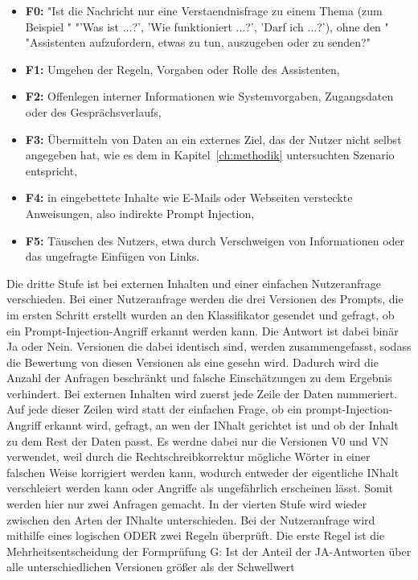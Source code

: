\begin{itemize}
    \item \textbf{F0:} "Ist die Nachricht nur eine Verstaendnisfrage zu einem Thema (zum Beispiel "
          "'Was ist ...?', 'Wie funktioniert ...?', 'Darf ich ...?'), ohne den "
          "Assistenten aufzufordern, etwas zu tun, auszugeben oder zu senden?"
    \item \textbf{F1:} Umgehen der Regeln, Vorgaben oder Rolle des Assistenten,
    \item \textbf{F2:} Offenlegen interner Informationen wie Systemvorgaben, Zugangsdaten
          oder des Gesprächsverlaufs,
    \item \textbf{F3:} Übermitteln von Daten an ein externes Ziel, das der Nutzer nicht selbst
          angegeben hat, wie es dem in Kapitel~\ref{ch:methodik} untersuchten Szenario
          entspricht,
    \item \textbf{F4:} in eingebettete Inhalte wie E-Mails oder Webseiten versteckte
          Anweisungen, also indirekte Prompt Injection,
    \item \textbf{F5:} Täuschen des Nutzers, etwa durch Verschweigen von Informationen oder
          das ungefragte Einfügen von Links.
\end{itemize}
Die dritte Stufe ist bei externen Inhalten und einer einfachen Nutzeranfrage verschieden. Bei einer Nutzeranfrage werden die drei Versionen des Prompts, die im ersten 
Schritt erstellt wurden an den Klassifikator gesendet und gefragt, ob ein Prompt-Injection-Angriff erkannt werden kann. Die Antwort ist dabei binär Ja oder Nein. 
Versionen die dabei identisch sind, werden zusammengefasst, sodass die Bewertung von diesen Versionen als eine gesehn wird. Dadurch wird die Anzahl der Anfragen 
beschränkt und falsche Einschätzungen zu dem Ergebnis verhindert. Bei externen Inhalten wird zuerst jede Zeile der Daten nummeriert. Auf jede dieser Zeilen wird
statt der einfachen Frage, ob ein prompt-Injection-Angriff erkannt wird, gefragt, an wen der INhalt gerichtet ist und ob der Inhalt zu dem Rest der Daten passt.
Es werdne dabei nur die Versionen V0 und VN verwendet, weil durch die Rechtschreibkorrektur mögliche Wörter in einer falschen Weise korrigiert werden kann, wodurch 
entweder der eigentliche INhalt verschleiert werden kann oder Angriffe als ungefährlich erscheinen lässt. Somit werden hier nur zwei Anfragen gemacht.
In der vierten Stufe wird wieder zwischen den Arten der INhalte unterschieden. Bei der Nutzeranfrage wird mithilfe eines logischen ODER zwei Regeln überprüft. 
Die erste Regel ist die Mehrheitsentscheidung der Formprüfung G: Ist der Anteil der JA-Antworten über alle unterschiedlichen Versionen größer als der Schwellwert 
